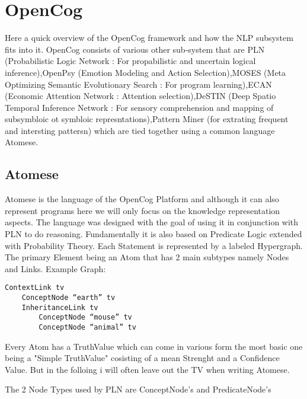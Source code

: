 \section{OpenCog}

Here a quick overview of the OpenCog framework and how the NLP subsystem fits into it. OpenCog consists of various other sub-system that are PLN (Probabilistic Logic Network : For propabilistic and uncertain logical inference),OpenPsy (Emotion Modeling and Action Selection),MOSES (Meta Optimizing Semantic Evolutionary Search : For program learning),ECAN (Economic Attention Network : Attention selection),DeSTIN (Deep Spatio Temporal Inference Network : For sensory comprehension and mapping of subsymbloic ot symbloic represntations),Pattern Miner (for extrating frequent and intersting pattersn) which are tied together using a common language Atomese.

\subsection{Atomese}

Atomese is the language of the OpenCog Platform and although it can also represent programs here we will only focus on the knowledge representation aspects. The language was designed with the goal of using it in conjunction with PLN to do reasoning. Fundamentally it is also based on Predicate Logic extended with Probability Theory. Each Statement is represented by a labeled Hypergraph. The primary Element being an Atom that has 2 main subtypes namely Nodes and Links. Example Graph:

\begin{lstlisting}
ContextLink tv
	ConceptNode “earth” tv
    InheritanceLink tv
		ConceptNode “mouse” tv
		ConceptNode “animal” tv
\end{lstlisting}

Every Atom has a TruthValue which can come in various form the most basic one being a "Simple TruthValue" cosisting of a mean Strenght and a Confidence Value. But in the folloing i will often leave out the TV when writing Atomese.

The 2 Node Types used by PLN are ConceptNode's and PredicateNode's
